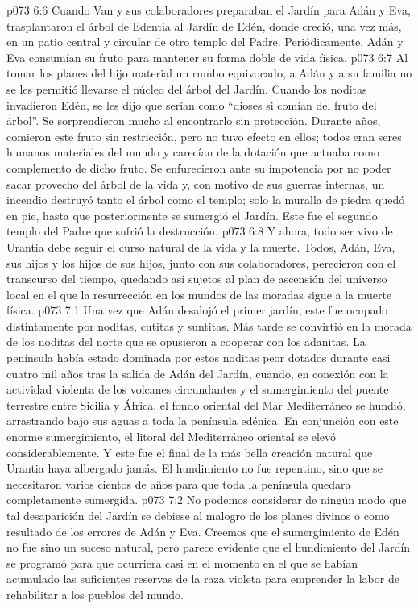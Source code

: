 \vs p073 6:6 Cuando Van y sus colaboradores preparaban el Jardín para Adán y Eva, trasplantaron el árbol de Edentia al Jardín de Edén, donde creció, una vez más, en un patio central y circular de otro templo del Padre. Periódicamente, Adán y Eva consumían su fruto para mantener su forma doble de vida física.
\vs p073 6:7 \pc Al tomar los planes del hijo material un rumbo equivocado, a Adán y a su familia no se les permitió llevarse el núcleo del árbol del Jardín. Cuando los noditas invadieron Edén, se les dijo que serían como “dioses si comían del fruto del árbol”. Se sorprendieron mucho al encontrarlo sin protección. Durante años, comieron este fruto sin restricción, pero no tuvo efecto en ellos; todos eran seres humanos materiales del mundo y carecían de la dotación que actuaba como complemento de dicho fruto. Se enfurecieron ante su impotencia por no poder sacar provecho del árbol de la vida y, con motivo de sus guerras internas, un incendio destruyó tanto el árbol como el templo; solo la muralla de piedra quedó en pie, hasta que posteriormente se sumergió el Jardín. Este fue el segundo templo del Padre que sufrió la destrucción.
\vs p073 6:8 Y ahora, todo ser vivo de Urantia debe seguir el curso natural de la vida y la muerte. Todos, Adán, Eva, sus hijos y los hijos de sus hijos, junto con sus colaboradores, perecieron con el transcurso del tiempo, quedando así sujetos al plan de ascensión del universo local en el que la resurrección en los mundos de las moradas sigue a la muerte física.
\vs p073 7:1 Una vez que Adán desalojó el primer jardín, este fue ocupado distintamente por noditas, cutitas y suntitas. Más tarde se convirtió en la morada de los noditas del norte que se opusieron a cooperar con los adanitas. La península había estado dominada por estos noditas peor dotados durante casi cuatro mil años tras la salida de Adán del Jardín, cuando, en conexión con la actividad violenta de los volcanes circundantes y el sumergimiento del puente terrestre entre Sicilia y África, el fondo oriental del Mar Mediterráneo se hundió, arrastrando bajo sus aguas a toda la península edénica. En conjunción con este enorme sumergimiento, el litoral del Mediterráneo oriental se elevó considerablemente. Y este fue el final de la más bella creación natural que Urantia haya albergado jamás. El hundimiento no fue repentino, sino que se necesitaron varios cientos de años para que toda la península quedara completamente sumergida.
\vs p073 7:2 No podemos considerar de ningún modo que tal desaparición del Jardín se debiese al malogro de los planes divinos o como resultado de los errores de Adán y Eva. Creemos que el sumergimiento de Edén no fue sino un suceso natural, pero parece evidente que el hundimiento del Jardín se programó para que ocurriera casi en el momento en el que se habían acumulado las suficientes reservas de la raza violeta para emprender la labor de rehabilitar a los pueblos del mundo.
